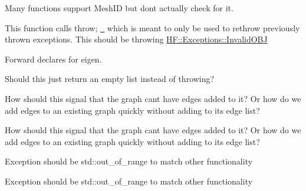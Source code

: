 \begin{DoxyRefList}
Many functions support Mesh\+ID but don\textquotesingle{}t actually check for it.  
\item[Member \mbox{\hyperlink{a01163_ab51061e309585cc48d58a6170ccea619}{HF\+::Ray\+Tracer\+::Embree\+Ray\+Tracer\+::Embree\+Ray\+Tracer}} (std\+::vector$<$ H\+F\+::\+Geometry\+::\+Mesh\+Info $>$ \&MI)]\label{a00264__todo000021}%
%
This function calls {\ttfamily  throw; } \href{https://en.cppreference.com/w/cpp/language/throw}{\texttt{ }} which is meant to only be used to rethrow previously thrown exceptions. This should be throwing \mbox{\hyperlink{a01115}{H\+F\+::\+Exceptions\+::\+Invalid\+O\+BJ}}  
\item[" ]\label{a00264__todo000022}%
%
Forward declares for eigen.  
\item[Member \mbox{\hyperlink{a01199_a7c2ea4fda7d310b500456ff14527bab9}{HF\+::Spatial\+Structures\+::Graph\+::operator\mbox{[}\mbox{]}}} (const \mbox{\hyperlink{a01203}{Node}} \&n) const]\label{a00264__todo000023}%
%
Should this just return an empty list instead of throwing?  
\item[Member \mbox{\hyperlink{a01199_a604a648f1f73d687ad4544d2ac163212}{HF\+::Spatial\+Structures\+::Graph\+::add\+Edge}} (const \mbox{\hyperlink{a01203}{Node}} \&parent, const \mbox{\hyperlink{a01203}{Node}} \&child, float score=1.\+0f)]\label{a00264__todo000024}%
%
How should this signal that the graph can\textquotesingle{}t have edges added to it? Or how do we add edges to an existing graph quickly without adding to its edge list? 
\item[Member \mbox{\hyperlink{a01199_afa04fa06b0802acd9eebe46a8c7a1787}{HF\+::Spatial\+Structures\+::Graph\+::add\+Edge}} (int parent\+\_\+id, int child\+\_\+id, float score)]\label{a00264__todo000025}%
%
How should this signal that the graph can\textquotesingle{}t have edges added to it? Or how do we add edges to an existing graph quickly without adding to its edge list?  
\item[Member \mbox{\hyperlink{a01203_a556efc898ddc67b64fff560d0c7b5a0a}{HF\+::Spatial\+Structures\+::Node\+::operator\mbox{[}\mbox{]}}} (int i)]\label{a00264__todo000026}%
%
Exception should be std\+::out\+\_\+of\+\_\+range to match other functionality 
\item[Member \mbox{\hyperlink{a01203_ae3e88bd4eecfdbd93431953ed07b8a7b}{HF\+::Spatial\+Structures\+::Node\+::operator\mbox{[}\mbox{]}}} (int i) const]\label{a00264__todo000027}%
%
Exception should be std\+::out\+\_\+of\+\_\+range to match other functionality
\end{DoxyRefList}